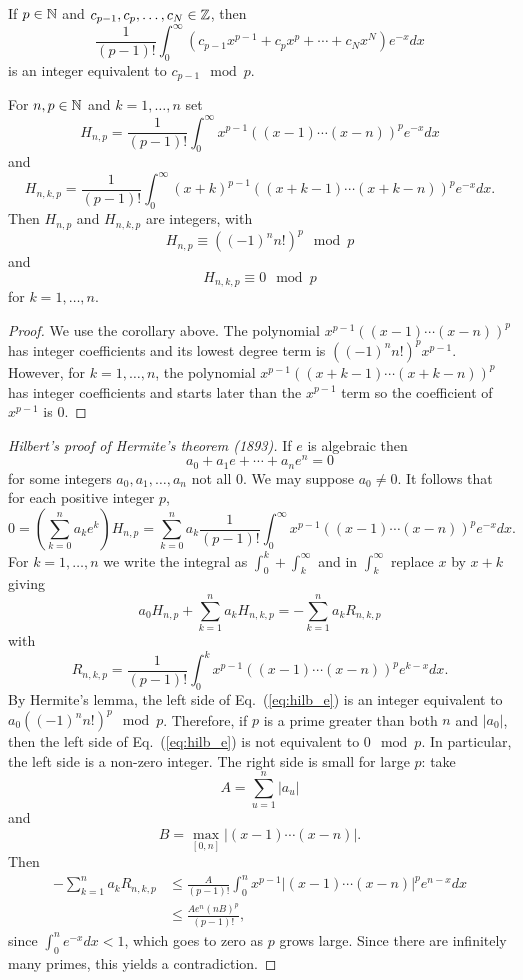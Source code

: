 \documentclass{mathnotes}
\begin{document}
\begin{cor}
    If $p\in\mathbb{N}$ and $c_{p-1},c_p,\ldots,c_N\in\mathbb{Z}$, then
    \[\frac{1}{(p-1)!}\int_0^\infty \left( c_{p-1}x^{p-1}+c_px^p+\cdots+c_Nx^N \right)e^{-x} dx\]
    is an integer equivalent to $c_{p-1}\mod p$.
\end{cor}

\begin{lem}[Hermite]
    For $n,p\in\mathbb{N}$ and $k=1,\ldots, n$ set
    \[H_{n,p}=\frac{1}{(p-1)!}\int_0^\infty x^{p-1}\left( (x-1)\cdots(x-n) \right)^pe^{-x}dx\]
    and 
    \[H_{n,k,p}=\frac{1}{(p-1)!}\int_0^\infty (x+k)^{p-1}\left( (x+k-1)\cdots(x+k-n) \right)^pe^{-x}dx.\]
    Then $H_{n,p}$ and $H_{n,k,p}$ are integers, with
    \[H_{n,p}\equiv \left( (-1)^n n! \right)^p\mod p\]
    and
    \[H_{n,k,p}\equiv 0\mod p\]
    for $k=1,\ldots,n$.
\end{lem}
\begin{proof}
    We use the corollary above.
    The polynomial $x^{p-1}\left( (x-1)\cdots(x-n) \right)^p$ has integer coefficients and its
    lowest degree term is $\left( (-1)^nn! \right)^px^{p-1}$. However, for $k=1,\ldots,n$,
    the polynomial $x^{p-1}\left( (x+k-1)\cdots(x+k-n) \right)^p$ has integer
    coefficients and starts later than the $x^{p-1}$ term so the coefficient of $x^{p-1}$ is 0.
\end{proof}

\begin{proof}[Hilbert's proof of Hermite's theorem (1893)]
    If $e$ is algebraic then
    \[a_0+a_1e+\cdots+a_ne^n=0\]
    for some integers $a_0,a_1,\ldots,a_n$ not all 0. We may suppose $a_0\neq 0$. It follows that for
    each positive integer $p$,
    \[0=\left( \sum_{k=0}^na_ke^k \right)H_{n,p}=\sum_{k=0}^na_k\frac{1}{(p-1)!}\int_0^\infty x^{p-1}\left( (x-1)\cdots(x-n) \right)^pe^{-x} dx.\]
    For $k=1,\ldots,n$ we write the integral as $\int_0^k+\int_k^\infty$ and in $\int_k^\infty$ replace $x$ by $x+k$ giving
    \begin{equation}
        a_0H_{n,p}+\sum_{k=1}^n a_kH_{n,k,p}=-\sum_{k=1}^na_kR_{n,k,p}
        \label{eq:hilb_e}
    \end{equation}
    with
    \[R_{n,k,p}=\frac{1}{(p-1)!}\int_0^k x^{p-1}\left( (x-1)\cdots(x-n) \right)^pe^{k-x}dx.\]
    By Hermite's lemma, the left side of Eq.~(\ref{eq:hilb_e}) is an integer equivalent to $a_0\left( (-1)^nn! \right)^p\mod p$.
    Therefore, if $p$ is a prime greater than both $n$ and $|a_0|$, then the left side of Eq.~(\ref{eq:hilb_e}) is not
    equivalent to $0\mod p$. In particular, the left side is a non-zero integer.
    The right side is small for large $p$: take
    \[A=\sum_{u=1}^n|a_u|\]
    and
    \[B=\max_{[0,n]}|(x-1)\cdots(x-n)|.\]
    Then
    \begin{align*}
        -\sum_{k=1}^na_kR_{n,k,p}&\leq \frac{A}{(p-1)!}\int_0^nx^{p-1}|(x-1)\cdots(x-n)|^pe^{n-x}dx\\
        &\leq \frac{Ae^n(nB)^p}{(p-1)!},
    \end{align*}
    since $\int_0^ne^{-x}dx<1$, which goes to zero as $p$ grows large. Since there are infinitely many primes, this yields
    a contradiction.
\end{proof}
\end{document}
